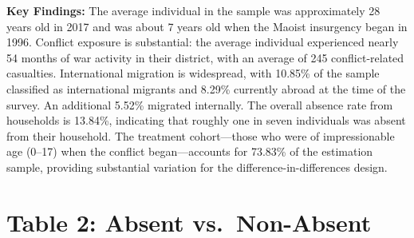 \documentclass[12pt,letterpaper]{article}
\begin{document}
\noindent\textbf{Key Findings:} The average individual in the sample was approximately 28 years old in 2017 and was about 7 years old when the Maoist insurgency began in 1996. Conflict exposure is substantial: the average individual experienced nearly 54 months of war activity in their district, with an average of 245 conflict-related casualties. International migration is widespread, with 10.85\% of the sample classified as international migrants and 8.29\% currently abroad at the time of the survey. An additional 5.52\% migrated internally. The overall absence rate from households is 13.84\%, indicating that roughly one in seven individuals was absent from their household. The treatment cohort---those who were of impressionable age (0--17) when the conflict began---accounts for 73.83\% of the estimation sample, providing substantial variation for the difference-in-differences design.


\section{Table 2: Absent vs.\ Non-Absent}
\end{document}
